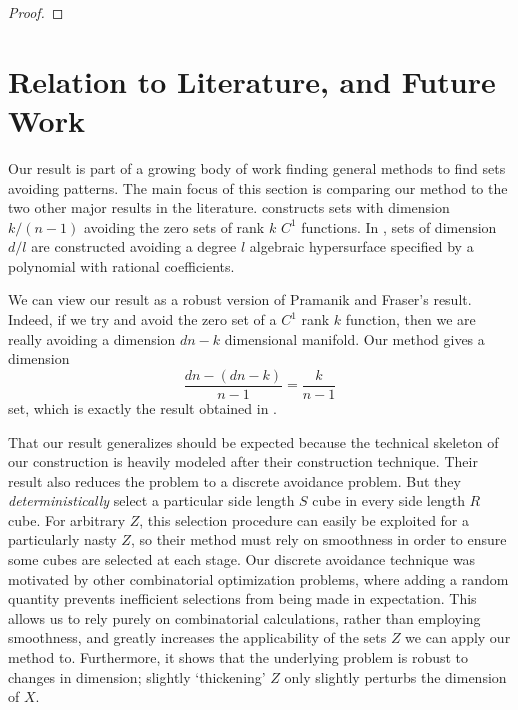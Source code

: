 \documentclass[dvipsnames,letterpaper,12pt]{article}
\numberwithin{equation}{section}
\theoremstyle{plain}
\begin{document}
\begin{proof}
\end{proof}











\section{Relation to Literature, and Future Work}\label{futureWorkSection}

Our result is part of a growing body of work finding general methods to find sets avoiding patterns. The main focus of this section is comparing our method to the two other major results in the literature. \cite{MalabikaRob} constructs sets with dimension $k/(n-1)$ avoiding the zero sets of rank $k$ $C^1$ functions. In \cite{Mathe}, sets of dimension $d/l$ are constructed avoiding a degree $l$ algebraic hypersurface specified by a polynomial with rational coefficients.

We can view our result as a robust version of Pramanik and Fraser's result. Indeed, if we try and avoid the zero set of a $C^1$ rank $k$ function, then we are really avoiding a dimension $dn - k$ dimensional manifold. Our method gives a dimension
%
\[ \frac{dn - (dn - k)}{n - 1} = \frac{k}{n - 1} \]
%
set, which is exactly the result obtained in \cite{MalabikaRob}.

That our result generalizes \cite{MalabikaRob} should be expected because the technical skeleton of our construction is heavily modeled after their construction technique. Their result also reduces the problem to a discrete avoidance problem. But they {\it deterministically} select a particular side length $S$ cube in every side length $R$ cube. For arbitrary $Z$, this selection procedure can easily be exploited for a particularly nasty $Z$, so their method must rely on smoothness in order to ensure some cubes are selected at each stage. Our discrete avoidance technique was motivated by other combinatorial optimization problems, where adding a random quantity prevents inefficient selections from being made in expectation. This allows us to rely purely on combinatorial calculations, rather than employing smoothness, and greatly increases the applicability of the sets $Z$ we can apply our method to. Furthermore, it shows that the underlying problem is robust to changes in dimension; slightly `thickening' $Z$ only slightly perturbs the dimension of $X$.
\end{document}

